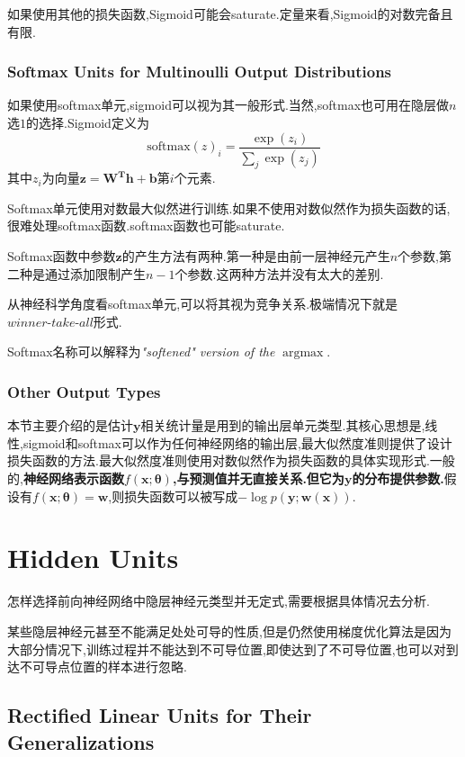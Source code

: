 如果使用其他的损失函数,Sigmoid可能会saturate.定量来看,Sigmoid的对数完备且有限.

\subsubsection{Softmax Units for Multinoulli Output Distributions}

如果使用softmax单元,sigmoid可以视为其一般形式.当然,softmax也可用在隐层做$n$选$1$的选择.Sigmoid定义为
\begin{equation}
\text{softmax}(z)_i=\frac{\exp(z_i)}{\sum_j\exp(z_j)}
\end{equation}
其中$z_i$为向量$\bm{z=W^Th+b}$第$i$个元素.

Softmax单元使用对数最大似然进行训练.如果不使用对数似然作为损失函数的话,很难处理softmax函数.softmax函数也可能saturate.

Softmax函数中参数$\bm z$的产生方法有两种.第一种是由前一层神经元产生$n$个参数,第二种是通过添加限制产生$n-1$个参数.这两种方法并没有太大的差别.

从神经科学角度看softmax单元,可以将其视为竞争关系.极端情况下就是$\textit{winner-take-all}$形式.

Softmax名称可以解释为\textit{"softened" version of the} $\mathop{\arg\max}$.

\subsubsection{Other Output Types}

本节主要介绍的是估计$\bm y$相关统计量是用到的输出层单元类型.其核心思想是,线性,sigmoid和softmax可以作为任何神经网络的输出层,最大似然度准则提供了设计损失函数的方法.最大似然度准则使用对数似然作为损失函数的具体实现形式.一般的,\textbf{神经网络表示函数$f(\bm x;{\bm\theta})$,与预测值并无直接关系.但它为$\bm y$的分布提供参数.}假设有$f(\bm x;{\bm\theta})=\bm w$,则损失函数可以被写成$-\log p(\bm y;\bm{w(x)})$.

\section{Hidden Units}

怎样选择前向神经网络中隐层神经元类型并无定式,需要根据具体情况去分析.

某些隐层神经元甚至不能满足处处可导的性质,但是仍然使用梯度优化算法是因为大部分情况下,训练过程并不能达到不可导位置,即使达到了不可导位置,也可以对到达不可导点位置的样本进行忽略.

\subsection{Rectified Linear Units for Their Generalizations}

